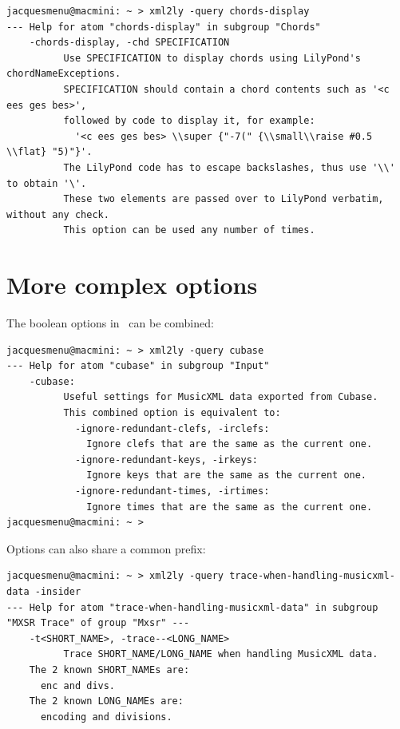\begin{lstlisting}[language=Terminal]
jacquesmenu@macmini: ~ > xml2ly -query chords-display
--- Help for atom "chords-display" in subgroup "Chords"
    -chords-display, -chd SPECIFICATION
          Use SPECIFICATION to display chords using LilyPond's chordNameExceptions.
          SPECIFICATION should contain a chord contents such as '<c ees ges bes>',
          followed by code to display it, for example:
            '<c ees ges bes> \\super {"-7(" {\\small\\raise #0.5 \\flat} "5)"}'.
          The LilyPond code has to escape backslashes, thus use '\\' to obtain '\'.
          These two elements are passed over to LilyPond verbatim, without any check.
          This option can be used any number of times.
\end{lstlisting}


\section{More complex options}

The boolean options in \mf\ can be combined:
\begin{lstlisting}[language=Terminal]
jacquesmenu@macmini: ~ > xml2ly -query cubase
--- Help for atom "cubase" in subgroup "Input"
    -cubase:
          Useful settings for MusicXML data exported from Cubase.
          This combined option is equivalent to:
            -ignore-redundant-clefs, -irclefs:
              Ignore clefs that are the same as the current one.
            -ignore-redundant-keys, -irkeys:
              Ignore keys that are the same as the current one.
            -ignore-redundant-times, -irtimes:
              Ignore times that are the same as the current one.
jacquesmenu@macmini: ~ >
\end{lstlisting}

Options can also share a common prefix:
\begin{lstlisting}[language=Terminal]
jacquesmenu@macmini: ~ > xml2ly -query trace-when-handling-musicxml-data -insider
--- Help for atom "trace-when-handling-musicxml-data" in subgroup "MXSR Trace" of group "Mxsr" ---
    -t<SHORT_NAME>, -trace--<LONG_NAME>
          Trace SHORT_NAME/LONG_NAME when handling MusicXML data.
    The 2 known SHORT_NAMEs are:
      enc and divs.
    The 2 known LONG_NAMEs are:
      encoding and divisions.
\end{lstlisting}

